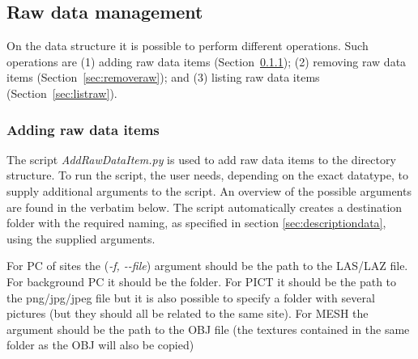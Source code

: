 \subsection{Raw data management}
On the data structure it is possible to perform different operations. Such operations
are (1) adding raw data items (Section~\ref{sec:addraw}); (2) removing raw data
items (Section~\ref{sec:removeraw}); and (3) listing raw data items (Section~\ref{sec:listraw}).

\subsubsection{Adding raw data items}
\label{sec:addraw} 
The script \textit{AddRawDataItem.py} is used to add raw data items to the directory
structure. To run the script, the user needs, depending on the exact datatype,
to supply additional arguments to the script. An overview of the possible arguments
are found in the verbatim below. The script automatically creates a destination
folder with the required naming, as specified in section \ref{sec:descriptiondata},
using the supplied arguments.

For PC of sites the (\textit{-f, -\hspace{0cm}-file}) argument should be the path 
to the LAS/LAZ file. For background PC it should be the folder. 
For PICT it should be the path to the png/jpg/jpeg file but it is also possible to specify a folder with several pictures (but they should all be related to the same site).
For MESH the argument should be the path to the OBJ file (the textures contained in the same folder as the OBJ will also be copied)

